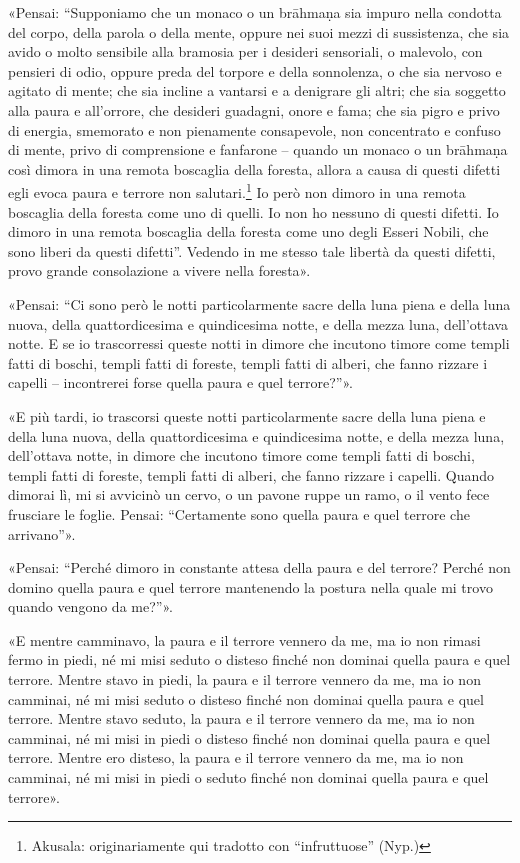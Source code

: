 «Pensai: “Supponiamo che un monaco o un brāhmaṇa sia impuro nella condotta del
corpo, della parola o della mente, oppure nei suoi mezzi di sussistenza, che sia
avido o molto sensibile alla bramosia per i desideri sensoriali, o malevolo, con
pensieri di odio, oppure preda del torpore e della sonnolenza, o che sia nervoso
e agitato di mente; che sia incline a vantarsi e a denigrare gli altri; che sia
soggetto alla paura e all’orrore, che desideri guadagni, onore e fama; che sia
pigro e privo di energia, smemorato e non pienamente consapevole, non
concentrato e confuso di mente, privo di comprensione e fanfarone – quando un
monaco o un brāhmaṇa così dimora in una remota boscaglia della foresta, allora a
causa di questi difetti egli evoca paura e terrore non
salutari.\footnote{Akusala: originariamente qui tradotto con “infruttuose”
  (Nyp.)} Io però non dimoro in una remota boscaglia della foresta come uno di
quelli. Io non ho nessuno di questi difetti. Io dimoro in una remota boscaglia
della foresta come uno degli Esseri Nobili, che sono liberi da questi difetti”.
Vedendo in me stesso tale libertà da questi difetti, provo grande consolazione a
vivere nella foresta».

«Pensai: “Ci sono però le notti particolarmente sacre della luna piena e della
luna nuova, della quattordicesima e quindicesima notte, e della mezza luna,
dell’ottava notte. E se io trascorressi queste notti in dimore che incutono
timore come templi fatti di boschi, templi fatti di foreste, templi fatti di
alberi, che fanno rizzare i capelli – incontrerei forse quella paura e quel
terrore?”».

«E più tardi, io trascorsi queste notti particolarmente sacre della luna piena e
della luna nuova, della quattordicesima e quindicesima notte, e della mezza
luna, dell’ottava notte, in dimore che incutono timore come templi fatti di
boschi, templi fatti di foreste, templi fatti di alberi, che fanno rizzare i
capelli. Quando dimorai lì, mi si avvicinò un cervo, o un pavone ruppe un ramo,
o il vento fece frusciare le foglie. Pensai: “Certamente sono quella paura e
quel terrore che arrivano”».

«Pensai: “Perché dimoro in constante attesa della paura e del terrore? Perché
non domino quella paura e quel terrore mantenendo la postura nella quale mi
trovo quando vengono da me?”».

«E mentre camminavo, la paura e il terrore vennero da me, ma io non rimasi fermo
in piedi, né mi misi seduto o disteso finché non dominai quella paura e quel
terrore. Mentre stavo in piedi, la paura e il terrore vennero da me, ma io non
camminai, né mi misi seduto o disteso finché non dominai quella paura e quel
terrore. Mentre stavo seduto, la paura e il terrore vennero da me, ma io non
camminai, né mi misi in piedi o disteso finché non dominai quella paura e quel
terrore. Mentre ero disteso, la paura e il terrore vennero da me, ma io non
camminai, né mi misi in piedi o seduto finché non dominai quella paura e quel
terrore».

